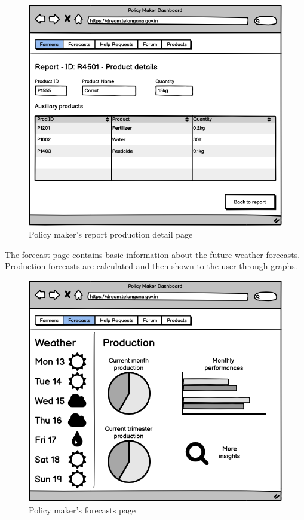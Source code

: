 \documentclass[10pt]{article} %
\begin{document}
\begin{figure}[h!]
    \centering
    \centerline{\includegraphics[scale=0.54]{images/uimockups/pm_reportproductdetail.png}}
    \caption{Policy maker's report production detail page}
    \label{fig:ui_pm_reportproductdetail}
\end{figure}
\newpage

The forecast page contains basic information about the future weather forecasts. Production forecasts are calculated and then shown to the user through
graphs.\\
\begin{figure}[h!]
    \centering
    \centerline{\includegraphics[scale=0.54]{images/uimockups/pm_forecasts.png}}
    \caption{Policy maker's forecasts page}
    \label{fig:ui_pm_forecasts}
\end{figure}
\newpage
\end{document}
